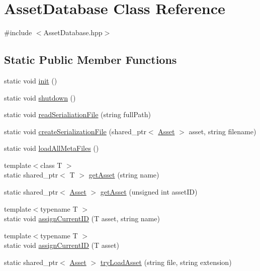 \hypertarget{class_asset_database}{}\section{Asset\+Database Class Reference}
\label{class_asset_database}


{\ttfamily \#include $<$Asset\+Database.\+hpp$>$}

\subsection*{Static Public Member Functions}
\begin{DoxyCompactItemize}
\item 
static void \hyperlink{class_asset_database_ae7102ec2e1c01fff217946fe03b4b8a4}{init} ()
\item 
static void \hyperlink{class_asset_database_a61392880e1fff5ec7b1c4cd31812efd1}{shutdown} ()
\item 
static void \hyperlink{class_asset_database_af81f7154e7e779974b776e76a4650277}{read\+Serialiation\+File} (string full\+Path)
\item 
static void \hyperlink{class_asset_database_a0277280f887d471a7f9a14102d6ea4a5}{create\+Serialization\+File} (shared\+\_\+ptr$<$ \hyperlink{class_asset}{Asset} $>$ asset, string filename)
\item 
static void \hyperlink{class_asset_database_a6929177caebd34d42dec699f19838fe1}{load\+All\+Meta\+Files} ()
\item 
{\footnotesize template$<$class T $>$ }\\static shared\+\_\+ptr$<$ T $>$ \hyperlink{class_asset_database_a9168af02cf1d567a8eb92184b69a0994}{get\+Asset} (string name)
\item 
static shared\+\_\+ptr$<$ \hyperlink{class_asset}{Asset} $>$ \hyperlink{class_asset_database_a03fc428514f43aad4c098261a5ee64d9}{get\+Asset} (unsigned int asset\+I\+D)
\item 
{\footnotesize template$<$typename T $>$ }\\static void \hyperlink{class_asset_database_ad6746e08dba5a75e8ed9869cdddd5652}{assign\+Current\+I\+D} (T asset, string name)
\item 
{\footnotesize template$<$typename T $>$ }\\static void \hyperlink{class_asset_database_a4a5dafe295b51eb6f779d7bae90c86c8}{assign\+Current\+I\+D} (T asset)
\item 
static shared\+\_\+ptr$<$ \hyperlink{class_asset}{Asset} $>$ \hyperlink{class_asset_database_a327f2cbdf751c34ee9cfa3f17631d6bc}{try\+Load\+Asset} (string file, string extension)

\end{DoxyCompactItemize}
